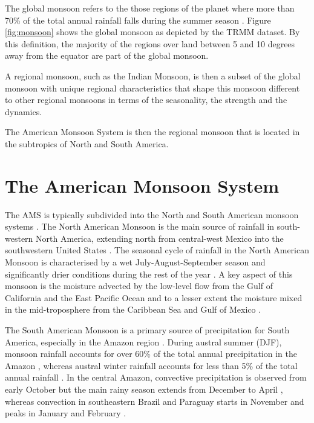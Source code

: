The global monsoon refers to the those regions of the planet where more than 70\% of the total annual rainfall falls during the summer season \citep{zhou2016,wang2017}.
Figure \ref{fig:monsoon} shows the global monsoon as depicted by the TRMM dataset. By this definition, the majority of the regions over land between 5 and 10 degrees away from the equator are part of the global monsoon.

A regional monsoon, such as the Indian Monsoon, is then a subset of the global monsoon with unique regional characteristics that shape this monsoon different to other regional monsoons in terms of the seasonality, the strength and the dynamics. 

The American Monsoon System is then the regional monsoon that is located in the subtropics of North and South America. 
\section{The American Monsoon System}\label{sq:bk_ams}

The AMS is typically subdivided into the North and South American monsoon systems \citep{vera2006}.
The North American Monsoon is the main source of rainfall in south-western North America, extending north from central-west Mexico into the southwestern United States \citep{adams1997,stensrud1997,vera2006}.
 The seasonal cycle of rainfall in the North American Monsoon is characterised by a wet July-August-September season and significantly drier conditions during the rest of the year \citep{adams1997}.
A key aspect of this monsoon is the moisture advected by the low-level flow from the Gulf of California and the East Pacific Ocean and to a lesser extent the moisture mixed in the mid-troposphere from the Caribbean Sea and Gulf of Mexico \citep[e.g][]{stensrud1997,pascale2016,ordonez2019}.

The South American Monsoon is a primary source of precipitation for South America, especially in the Amazon region \citep{gan2004,vera2006,jones2013}.
During austral summer (DJF), monsoon rainfall accounts for over 60\% of the total annual precipitation in the Amazon \citep{gan2004,marengo2012}, whereas
austral winter rainfall accounts for less than 5\% of the total annual rainfall \citep{vera2006}.
In the central Amazon, convective precipitation is observed from early October but the main rainy season extends from December to April \citep{machado2004,adams2013}, whereas convection in southeastern Brazil and Paraguay starts in November and peaks in January and February \citep{marengo2001,nieto2011}. 


